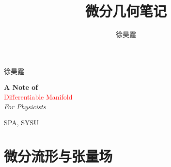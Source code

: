 \documentclass[11pt,a4paper]{ctexbook}
\title{微分几何笔记}
\author{徐昊霆}
\begin{document}
\begin{titlepage} %

	\raggedleft %
	
	\vspace*{\baselineskip} %
	
	
	{\Large 徐昊霆} %
	
	\vspace*{0.167\textheight} %
	
	
	\textbf{\LARGE A Note of}\\[\baselineskip] %
	
	{\textcolor{red}{\Huge Differentiable Manifold}}\\[\baselineskip] %
	
	{\Large \textit{For Physicists}} %
	
	\vfill %
	
	
	{\large SPA, SYSU} %
	
	\vspace*{3\baselineskip} %

\end{titlepage}

\tableofcontents
\newpage
\chapter{微分流形与张量场}
\end{document}
